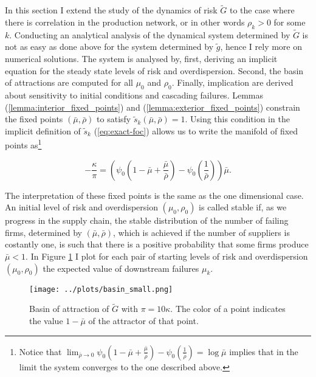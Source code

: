 \documentclass[../../main.tex]{subfiles}
\begin{document}
In this section I extend the study of the dynamics of risk $\tilde{G}$ to the case where there is correlation in the production network, or in other words $\rho_k > 0$ for some $k$. Conducting an analytical analysis of the dynamical system determined by $\tilde{G}$ is not as easy as done above for the system determined by $\tilde{g}$, hence I rely more on numerical solutions. The system is analysed by, first, deriving an implicit equation for the steady state levels of risk and overdispersion. Second, the basin of attractions are computed for all $\mu_0$ and $\rho_0$. Finally, implication are derived about sensitivity to initial conditions and cascading failures. Lemmas (\ref{lemma:interior_fixed_points}) and (\ref{lemma:exterior_fixed_points}) constrain the fixed points $(\bar{\mu}, \bar{\rho})$ to satisfy $\tilde{s}_k(\bar{\mu}, \bar{\rho})= 1$. Using this condition in the implicit definition of $\tilde{s}_k$ (\ref{eq:exact-foc}) allows us to write the manifold of fixed points as\footnote{Notice that $\lim_{\bar{\rho} \to 0} \psi_0\left(1 - \bar{\mu} + \frac{ \bar{\mu} }{\bar{\rho}} \right) - \psi_0\left(\frac{1}{\bar{\rho}} \right)= \log \bar{\mu} $ implies that in the limit the system converges to the one described above.}

\begin{equation}
  -\frac{\kappa}{\pi} = \left( \psi_0\left(1 - \bar{\mu} + \frac{ \bar{\mu} }{\bar{\rho}} \right) - \psi_0\left(\frac{1}{\bar{\rho}} \right) \right) \bar{\mu}.
\end{equation}

The interpretation of these fixed points is the same as the one dimensional case. An initial level of risk and overdispersion $(\mu_0, \rho_0)$ is called stable if, as we progress in the supply chain, the stable distribution of the number of failing firms, determined by $(\bar{\mu}, \bar{\rho})$, which is achieved if the number of suppliers is costantly one, is such that there is a positive probability that some firms produce $\bar{\mu} < 1$. In Figure \ref{fig:two-dimensional:basin} I plot for each pair of starting levels of risk and overdispersion $(\mu_0, \rho_0)$ the expected value of downstream failures $\mu_k$. 

\begin{figure}[H]
  \centering
  \texttt{[image: ../plots/basin\_small.png]}
  \caption{Basin of attraction of $\tilde{G}$ with $\pi = 10 \kappa$. The color of a point indicates the value $1 - \bar{\mu}$ of the attractor of that point.}
  \label{fig:two-dimensional:basin}
\end{figure}
\end{document}
